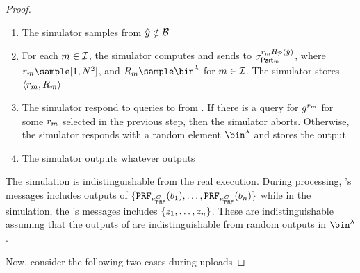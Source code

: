 \begin{proof}
\begin{itemize}
\begin{enumerate}[resume]
\begin{enumerate}
\item The simulator samples from $\hat{\genericCInputElmt} \notin \blocklist$
\item For each $m \in \mathcal{I}$, the simulator computes and sends to \server $\genericSig[\partition{\partitionIdx}]^{\genericRand_\partitionIdx \primeRO(\hat{\genericCInputElmt})}$, where $\genericRand_\partitionIdx \sample [1, \rsaMod^2]$, and $R_\partitionIdx \sample \bin^{\secParam}$ for $m \in \mathcal{I}$.  The simulator stores $\langle \genericRand_\partitionIdx, R_\partitionIdx \rangle$
\item The simulator respond to queries to \ro from \server. If there is a query for $\qrGen^{\genericRand_\partitionIdx}$ for some $\genericRand_\partitionIdx$ selected in the previous step, then the simulator aborts. Otherwise, the simulator responds with a random element $\bin^{\secParam}$ and stores the output
\item The simulator outputs whatever \server outputs
\end{enumerate}
\end{enumerate}
\end{itemize}


The simulation is indistinguishable from the real execution. During processing, \server's messages includes outputs of \authOPRFFunc 
$\{ \prf{\prfKeyClient}(\genericBlocklistElmt_1), \dots,   \prf{\prfKeyClient}(\genericBlocklistElmt_\blocklistSize)\}$
while in the simulation, the \server's messages includes $\{ z_1, \dots, z_n \}$. These are indistinguishable assuming that the outputs of \prf are indistinguishable from random outputs in $\bin^{\secParam}$. 




Now, consider the following two cases during uploads



\end{proof}

